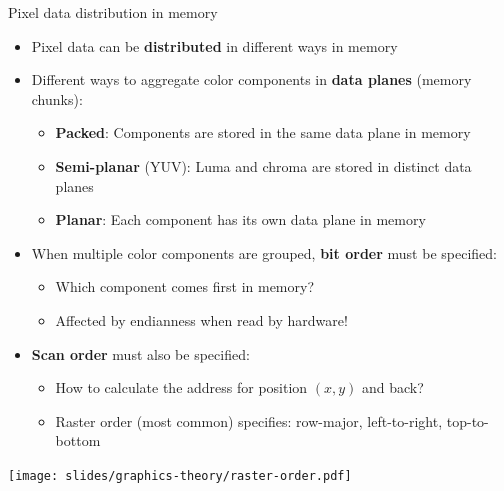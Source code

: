 \begin{frame}{Pixel data distribution in memory}
  \begin{itemize}
  \item Pixel data can be \textbf{distributed} in different ways in memory
  \item Different ways to aggregate color components in \textbf{data planes} (memory chunks):
    \begin{itemize}
    \item \textbf{Packed}: Components are stored in the same data plane in memory
    \item \textbf{Semi-planar} (YUV): Luma and chroma are stored in distinct data planes
    \item \textbf{Planar}: Each component has its own data plane in memory
    \end{itemize}
  \item When multiple color components are grouped, \textbf{bit order} must be specified:
    \begin{itemize}
    \item Which component comes first in memory?
    \item Affected by endianness when read by hardware!
    \end{itemize}
  \item \textbf{Scan order} must also be specified:
    \begin{itemize}
    \item How to calculate the address for position \((x,y)\) and back?
    \item Raster order (most common) specifies: row-major, left-to-right, top-to-bottom
    \end{itemize}
  \end{itemize}
  \begin{center}
  \texttt{[image: slides/graphics-theory/raster-order.pdf]}
  \end{center}
\end{frame}

